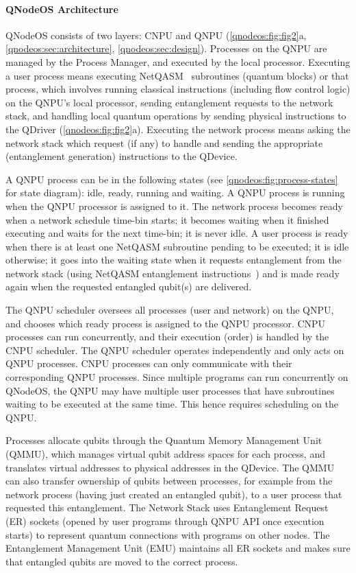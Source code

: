 \paragraph{QNodeOS Architecture}

QNodeOS consists of two layers: CNPU and QNPU (\cref{qnodeos:fig:fig2}a, \cref{qnodeos:sec:architecture}, \cref{qnodeos:sec:design}).
Processes on the QNPU are managed by the Process Manager, and executed by the local processor.
Executing a user process means executing NetQASM~\cite{dahlberg_2022_netqasm} subroutines (quantum blocks) or that process, which involves running classical instructions (including flow control logic) on the QNPU's local processor, sending entanglement requests to the network stack, and handling local quantum operations by sending physical instructions to the QDriver (\cref{qnodeos:fig:fig2}a).
Executing the network process means asking the network stack which request (if any) to handle and sending the appropriate (entanglement generation) instructions to the QDevice. 

A QNPU process can be in the following states (see \cref{qnodeos:fig:process-states} for state diagram): idle, ready, running and waiting.
A QNPU process is running when the QNPU processor is assigned to it.
The network process becomes ready when a network schedule time-bin starts; it becomes waiting when it finished executing and waits for the next time-bin; it is never idle.
A user process is ready when there is at least one NetQASM subroutine pending to be executed; it is idle otherwise; it goes into the waiting state when it requests entanglement from the network stack (using NetQASM entanglement instructions~\cite{dahlberg_2022_netqasm}) and is made ready again when the requested entangled qubit(s) are delivered. 

The QNPU scheduler oversees all processes (user and network) on the QNPU, and chooses which ready process is assigned to the QNPU processor.
CNPU processes can run concurrently, and their execution (order) is handled by the CNPU scheduler.
The QNPU scheduler operates independently and only acts on QNPU processes.
CNPU processes can only communicate with their corresponding QNPU processes.
Since multiple programs can run concurrently on QNodeOS, the QNPU may have multiple user processes that have subroutines waiting to be executed at the same time.
This hence requires scheduling on the QNPU.

Processes allocate qubits through the Quantum Memory Management Unit (QMMU), which manages virtual qubit address spaces for each process, and translates virtual addresses to physical addresses in the QDevice.
The QMMU can also transfer ownership of qubits between processes, for example from the network process (having just created an entangled qubit), to a user process that requested this entanglement.
The Network Stack uses Entanglement Request (ER) sockets (opened by user programs through QNPU API once execution starts) to represent quantum connections with programs on other nodes.
The Entanglement Management Unit (EMU) maintains all ER sockets and makes sure that entangled qubits are moved to the correct process.

